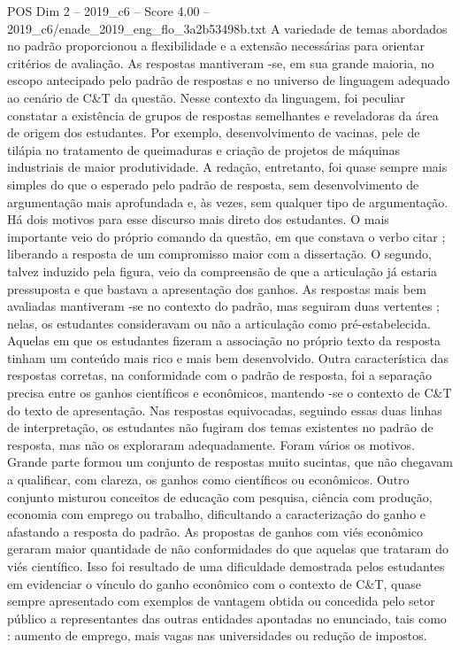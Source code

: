 \begin{textsample}{POS Dim 2 – 2019\_c6 – Score 4.00 – 2019\_c6/enade\_2019\_eng\_flo\_3a2b53498b.txt}
A variedade de temas abordados no padrão proporcionou a flexibilidade e a extensão necessárias para orientar critérios de avaliação.
As respostas mantiveram -se, em sua grande maioria, no escopo antecipado pelo padrão de respostas e no universo de linguagem adequado ao cenário de C\&T da questão.
Nesse contexto da linguagem, foi peculiar constatar a existência de grupos de respostas semelhantes e reveladoras da área de origem dos estudantes.
Por exemplo, desenvolvimento de vacinas, pele de tilápia no tratamento de queimaduras e criação de projetos de máquinas industriais de maior produtividade.
A redação, entretanto, foi quase sempre mais simples do que o esperado pelo padrão de resposta, sem desenvolvimento de argumentação mais aprofundada e, às vezes, sem qualquer tipo de argumentação.
Há dois motivos para esse discurso mais direto dos estudantes.
O mais importante veio do próprio comando da questão, em que constava o verbo citar ; liberando a resposta de um compromisso maior com a dissertação.
O segundo, talvez induzido pela figura, veio da compreensão de que a articulação já estaria pressuposta e que bastava a apresentação dos ganhos.
As respostas mais bem avaliadas mantiveram -se no contexto do padrão, mas seguiram duas vertentes ; nelas, os estudantes consideravam ou não a articulação como pré-estabelecida.
Aquelas em que os estudantes fizeram a associação no próprio texto da resposta tinham um conteúdo mais rico e mais bem desenvolvido.
Outra característica das respostas corretas, na conformidade com o padrão de resposta, foi a separação precisa entre os ganhos científicos e econômicos, mantendo -se o contexto de C\&T do texto de apresentação.
Nas respostas equivocadas, seguindo essas duas linhas de interpretação, os estudantes não fugiram dos temas existentes no padrão de resposta, mas não os exploraram adequadamente.
Foram vários os motivos.
Grande parte formou um conjunto de respostas muito sucintas, que não chegavam a qualificar, com clareza, os ganhos como científicos ou econômicos.
Outro conjunto misturou conceitos de educação com pesquisa, ciência com produção, economia com emprego ou trabalho, dificultando a caracterização do ganho e afastando a resposta do padrão.
As propostas de ganhos com viés econômico geraram maior quantidade de não conformidades do que aquelas que trataram do viés científico.
Isso foi resultado de uma dificuldade demostrada pelos estudantes em evidenciar o vínculo do ganho econômico com o contexto de C\&T, quase sempre apresentado com exemplos de vantagem obtida ou concedida pelo setor público a representantes das outras entidades apontadas no enunciado, tais como : aumento de emprego, mais vagas nas universidades ou redução de impostos.

\end{textsample}
